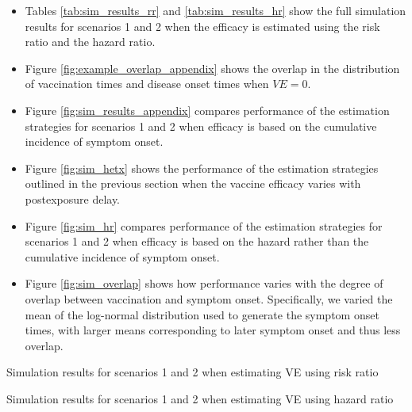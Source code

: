 \begin{appendix}
    \begin{itemize}
        \item Tables \ref{tab:sim_results_rr} and \ref{tab:sim_results_hr} show the full simulation results for scenarios 1 and 2 when the efficacy is estimated using the risk ratio and the hazard ratio.
        \item Figure \ref{fig:example_overlap_appendix} shows the overlap in the distribution of vaccination times and disease onset times when $VE = 0$.
        \item Figure \ref{fig:sim_results_appendix} compares performance of the estimation strategies for scenarios 1 and 2 when efficacy is based on the cumulative incidence of symptom onset.
        \item Figure \ref{fig:sim_hetx} shows the performance of the estimation strategies outlined in the previous section when the vaccine efficacy varies with postexposure delay. 
        \item Figure \ref{fig:sim_hr} compares performance of the estimation strategies for scenarios 1 and 2 when efficacy is based on the hazard rather than the cumulative incidence of symptom onset.
        \item Figure \ref{fig:sim_overlap} shows how performance varies with the degree of overlap between vaccination and symptom onset. Specifically, we varied the mean of the log-normal distribution used to generate the symptom onset times, with larger means corresponding to later symptom onset and thus less overlap.
    \end{itemize}

    \begin{table}[p]
        \centering
        \caption{Simulation results for scenarios 1 and 2 when estimating VE using risk ratio}\label{tab:sim_results_rr}
        
    \end{table}

    \begin{table}[p]
        \centering
        \caption{Simulation results for scenarios 1 and 2 when estimating VE using hazard ratio}\label{tab:sim_results_hr}
        
    \end{table}

    \clearpage


\end{appendix}
